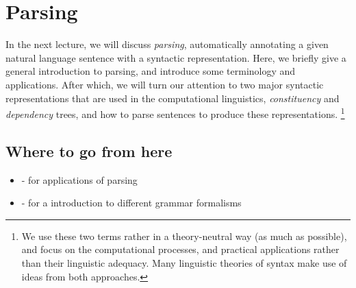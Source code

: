 \chapter{\label{chap:parsing}Parsing}


In the next lecture, we will discuss \emph{parsing}, 
automatically annotating a given natural language sentence
with a syntactic representation.
Here, we briefly give a general introduction to parsing,
and introduce some terminology and applications.
After which, we will turn our attention
to two major syntactic representations that are used
in the computational linguistics,
\emph{constituency} and \emph{dependency} trees,
and how to parse sentences to produce these representations.%
\footnote{%
  We use these two terms rather in a theory-neutral way
  (as much as possible),
  and focus on the computational processes,
  and practical applications rather than their linguistic adequacy.
  Many linguistic theories of syntax
  make use of ideas from both approaches.
}

\section*{Where to go from here}

\begin{itemize}
  \item \textcite{lease2006} - for applications of parsing
  \item \textcite{muller2016} - for a introduction to different grammar formalisms
\end{itemize}
